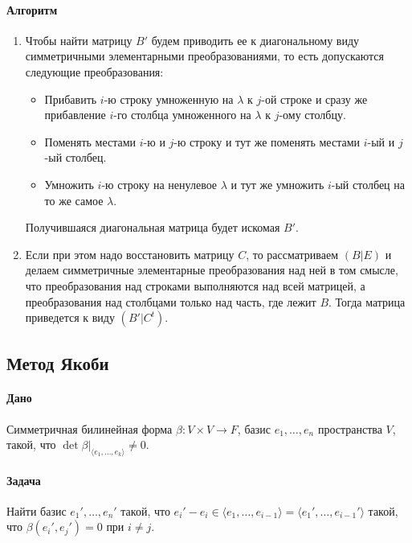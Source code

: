 \documentclass{article}
\begin{document}
\paragraph{Алгоритм}
\begin{enumerate}
\item Чтобы найти матрицу $B'$ будем приводить ее к диагональному виду симметричными элементарными преобразованиями, то есть допускаются следующие преобразования:
\begin{itemize}
\item Прибавить $i$-ю строку умноженную на $\lambda$ к $j$-ой строке и сразу же прибавление $i$-го столбца умноженного на $\lambda$ к $j$-ому столбцу.
\item Поменять местами $i$-ю и $j$-ю строку и тут же поменять местами $i$-ый и $j$-ый столбец.
\item Умножить $i$-ю строку на ненулевое $\lambda$ и тут же умножить $i$-ый столбец на то же самое $\lambda$.
\end{itemize}
Получившаяся диагональная матрица будет искомая $B'$.

\item Если при этом надо восстановить матрицу $C$, то рассматриваем $(B|E)$ и делаем симметричные элементарные преобразования над ней в том смысле, что преобразования над строками выполняются над всей матрицей, а преобразования над столбцами только над часть, где лежит $B$. Тогда матрица приведется к виду $(B'|C^t)$.
\end{enumerate}

\subsection{Метод Якоби}

\paragraph{Дано} Симметричная билинейная форма $\beta\colon V\times V \to F$, базис $e_1,\ldots,e_n$ пространства $V$, такой, что $\det \beta|_{\langle e_1,\ldots,e_k\rangle}\neq 0$.

\paragraph{Задача} Найти базис $e_1',\ldots,e_n'$ такой, что $e_i' - e_i\in \langle e_1,\ldots,e_{i-1}\rangle = \langle e_1',\ldots,e_{i-1}'\rangle$ такой, что $\beta(e_i',e_j') = 0$ при $i \neq j$.
\end{document}
